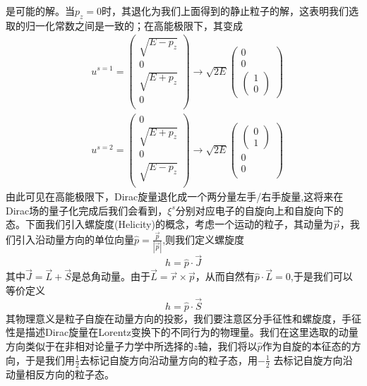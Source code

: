 是可能的解。当$p_{z}=0$时，其退化为我们上面得到的静止粒子的解，这表明我们选取的归一化常数之间是一致的；在高能极限下，其变成
\begin{equation}
\label{chap4highenergy}
\begin{aligned}
    &u^{s=1}=\left(\begin{array}{cc}
         \sqrt{E-p_{z}}  \\
         0 \\
         \sqrt{E+p_{z}}\\
         0\\
    \end{array}\right)\longrightarrow 
    \sqrt{2E}\left(\begin{array}{cc}
         0  \\
         0 \\
        \left(\begin{array}{cc}
             1  \\
             0 
        \end{array}\right)
    \end{array}\right)\\
    &u^{s=2}=\left(\begin{array}{cc}
    0\\
         \sqrt{E+p_{z}}  \\
         0 \\
         \sqrt{E-p_{z}}\\
    \end{array}\right)\longrightarrow 
    \sqrt{2E}\left(\begin{array}{cc}
         \left(\begin{array}{cc}
             0  \\
             1 
        \end{array}\right)\\
         0\\
         0\\
    \end{array}\right)
    \end{aligned}
\end{equation}
由此可见在高能极限下，Dirac旋量退化成一个两分量左手/右手旋量,这将来在Dirac场的量子化完成后我们会看到，$\xi^{s}$分别对应电子的自旋向上和自旋向下的态。下面我们引入螺旋度(Helicity)的概念，考虑一个运动的粒子，其动量为$\vec{p}$，我们引入沿动量方向的单位向量$\hat{p}=\frac{\vec{p}}{|\vec{p}|}$,则我们定义螺旋度
\begin{equation}
    h=\hat{p}\cdot \vec{J}
\end{equation}
其中$\vec{J}=\vec{L}+\vec{S}$是总角动量。由于$\vec{L}=\vec{r}\times \vec{p}$，从而自然有$\hat{p}\cdot \vec{L}=0$,于是我们可以等价定义
\begin{equation}
    h=\hat{p}\cdot \vec{S}
\end{equation}
其物理意义是粒子自旋在动量方向的投影，我们要注意区分手征性和螺旋度，手征性是描述Dirac旋量在Lorentz变换下的不同行为的物理量。我们在这里选取的动量方向类似于在非相对论量子力学中所选择的$z$轴，我们将以$\hat{p}$作为自旋的本征态的方向，于是我们用$\frac{1}{2}$去标记自旋方向沿动量方向的粒子态，用$-\frac{1}{2}$
去标记自旋方向沿动量相反方向的粒子态。

